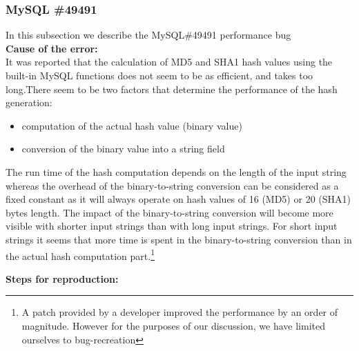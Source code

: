 \subsubsection{MySQL \#49491}

In this subsection we describe the MySQL\#49491 performance bug \\

\noindent \textbf{Cause of the error:} \\

It was reported that the calculation of MD5 and SHA1 hash values using the built-in MySQL functions does not seem to be as efficient, and takes too long.There seem to be two factors that determine the performance of the hash generation:
\begin{itemize}
	\item computation of the actual hash value (binary value)
	\item conversion of the binary value into a string field
\end{itemize}

The run time of the hash computation depends on the length of the input string whereas the overhead of the binary-to-string conversion can be considered as a fixed constant as it will always operate on hash values of 16 (MD5) or 20 (SHA1) bytes length.
The impact of the binary-to-string conversion will become more visible with shorter input strings than with long input strings. For short input strings it seems that more time is spent in the binary-to-string conversion than in the actual hash computation part.\footnote{A patch provided by a developer improved the performance by an order of magnitude. However for the purposes of our discussion, we have limited ourselves to bug-recreation}

\noindent \textbf{Steps for reproduction:} \\

